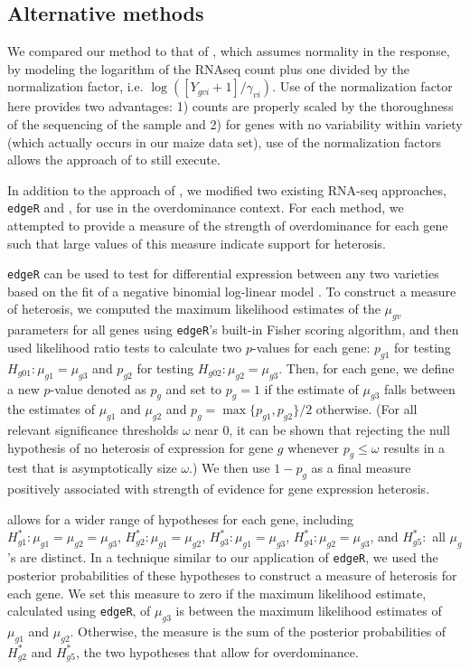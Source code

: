 \documentclass[useAMS,usenatbib,referee]{biom}
\newcommand{\edgeR}{{\tt edgeR}}
\newcommand{\RNAseq}{RNA-seq}
\begin{document}
\subsection{Alternative methods}
\label{s:alternative}

We compared our method to that of \cite{ji2014estimation}, which assumes normality in the response, by modeling the logarithm of the RNAseq count plus one divided by the normalization factor, i.e. $\log([Y_{gvi}+1]/\gamma_{vi})$. Use of the normalization factor here provides two advantages: 1) counts are properly scaled by the thoroughness of the sequencing of the sample and 2) for genes with no variability within variety (which actually occurs in our maize data set), use of the normalization factors allows the approach of \citeauthor{ji2014estimation} to still execute. 

In addition to the approach of \citeauthor{ji2014estimation}, we modified two existing \RNAseq{} approaches, \edgeR{} and \baqSeq{}, for use in the overdominance context. For each method, we attempted to provide a measure of the strength of overdominance for each gene such that large values of this measure indicate support for heterosis. 

\edgeR{} can be used to test for differential expression between any two varieties based on the fit of a negative binomial log-linear model \citep{robinson2007moderated, robinson2010edgeR}. To construct a measure of heterosis, we computed the maximum likelihood estimates of the $\mu_{gv}$ parameters for all genes using \edgeR{}'s built-in Fisher scoring algorithm, and then used likelihood ratio tests to calculate two $p$-values for each gene: $p_{g1}$  for testing $H_{g01}:\mu_{g1}=\mu_{g3}$ and $p_{g2}$ for testing $H_{g02}:\mu_{g2}=\mu_{g3}$. Then, for each gene, we define a new $p$-value denoted as $p_g$ and set to $p_g=1$ if the estimate of $\mu_{g3}$ falls between the estimates of $\mu_{g1}$ and $\mu_{g2}$ and $p_g=\max\{p_{g1},p_{g2}\}/2$ otherwise.  (For all relevant significance thresholds $\omega$ near 0, it can be shown that rejecting the null hypothesis of no heterosis of expression for gene $g$ whenever $p_g\leq \omega$ results in a test that is asymptotically size $\omega$.)  We then use $1-p_g$ as a final measure positively associated with strength of evidence for gene expression heterosis. 

\baqSeq{} allows for a wider range of hypotheses for each gene, including $H^*_{g1}: \mu_{g1}=\mu_{g2}=\mu_{g3}$, $H^*_{g 2}: \mu_{g1}=\mu_{g2}$, $H^*_{g 3}: \mu_{g1}=\mu_{g3}$, $H^*_{g 4}: \mu_{g2}=\mu_{g3}$, and $H^*_{g 5}:$ all $\mu_g$'s are distinct. In a technique similar to our application of \edgeR{}, we used the posterior probabilities of these hypotheses to construct a measure of heterosis for each gene. We set this measure to zero if the maximum likelihood estimate, calculated using \edgeR{}, of $\mu_{g3}$ is between the maximum likelihood estimates of $\mu_{g1}$ and $\mu_{g2}$. Otherwise, the measure is the sum of the posterior probabilities of $H^*_{g 2}$ and $H^*_{g 5}$, the two hypotheses that allow for overdominance.
\end{document}
